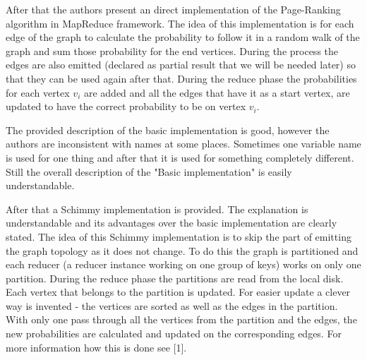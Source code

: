 \documentclass[12pt]{article}
\theoremstyle{plain}
\begin{document}

  After that the authors present an direct implementation of the
  Page-Ranking algorithm in MapReduce framework. The idea of this implementation
  is for each edge of the graph to calculate the probability to follow it in
  a random walk of the graph and sum those probability for the end vertices. 
  During the process the edges are also emitted (declared as partial result that
  we will be needed later) so that they can be used again after that. During the
  reduce phase the probabilities for each vertex $v_i$ are added and all the
  edges that have it as a start vertex, are updated to have the correct
  probability to be on vertex $v_i$.
  
  The provided description of the basic implementation is good, however the
  authors are inconsistent with names at some places. Sometimes one variable
  name is used for one thing and after that it is used for something completely
  different. Still the overall description of the "Basic implementation" is
  easily understandable.  

  After that a Schimmy implementation is provided. The explanation is
  understandable and its advantages over the basic implementation are clearly
  stated. The idea of this Schimmy implementation is to skip the part of
  emitting the graph topology as it does not change. To do this the graph is
  partitioned and each reducer (a reducer instance working on one group of
  keys) works on only one partition. During the reduce phase the partitions are
  read from the local disk. Each vertex that belongs to the partition is
  updated.  For easier update a clever way is invented - the vertices are
  sorted as well as the edges in the partition. With only one pass through all
  the vertices from the partition and the edges, the new probabilities are
  calculated and updated on the corresponding edges. For more information how
  this is done see [1]. 
\end{document}
